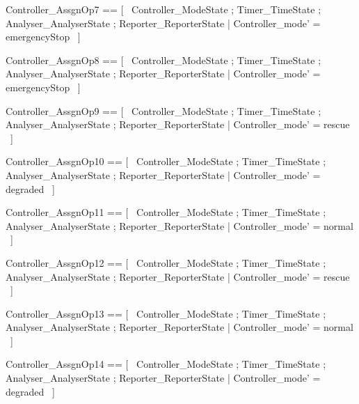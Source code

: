 \documentclass{article}
\begin{document}
\begin{zed}
	Controller\_AssgnOp7 == [~  \Delta Controller\_ModeState ; \Xi Timer\_TimeState ; \Xi Analyser\_AnalyserState ; \Xi Reporter\_ReporterState | Controller\_mode' = emergencyStop  ~]
\end{zed}

\begin{zed}
	Controller\_AssgnOp8 == [~  \Delta Controller\_ModeState ; \Xi Timer\_TimeState ; \Xi Analyser\_AnalyserState ; \Xi Reporter\_ReporterState | Controller\_mode' = emergencyStop  ~]
\end{zed}

\begin{zed}
	Controller\_AssgnOp9 == [~  \Delta Controller\_ModeState ; \Xi Timer\_TimeState ; \Xi Analyser\_AnalyserState ; \Xi Reporter\_ReporterState | Controller\_mode' = rescue  ~]
\end{zed}

\begin{zed}
	Controller\_AssgnOp10 == [~  \Delta Controller\_ModeState ; \Xi Timer\_TimeState ; \Xi Analyser\_AnalyserState ; \Xi Reporter\_ReporterState | Controller\_mode' = degraded  ~]
\end{zed}

\begin{zed}
	Controller\_AssgnOp11 == [~  \Delta Controller\_ModeState ; \Xi Timer\_TimeState ; \Xi Analyser\_AnalyserState ; \Xi Reporter\_ReporterState | Controller\_mode' = normal  ~]
\end{zed}

\begin{zed}
	Controller\_AssgnOp12 == [~  \Delta Controller\_ModeState ; \Xi Timer\_TimeState ; \Xi Analyser\_AnalyserState ; \Xi Reporter\_ReporterState | Controller\_mode' = rescue  ~]
\end{zed}

\begin{zed}
	Controller\_AssgnOp13 == [~  \Delta Controller\_ModeState ; \Xi Timer\_TimeState ; \Xi Analyser\_AnalyserState ; \Xi Reporter\_ReporterState | Controller\_mode' = normal  ~]
\end{zed}

\begin{zed}
	Controller\_AssgnOp14 == [~  \Delta Controller\_ModeState ; \Xi Timer\_TimeState ; \Xi Analyser\_AnalyserState ; \Xi Reporter\_ReporterState | Controller\_mode' = degraded  ~]
\end{zed}
\end{document}
